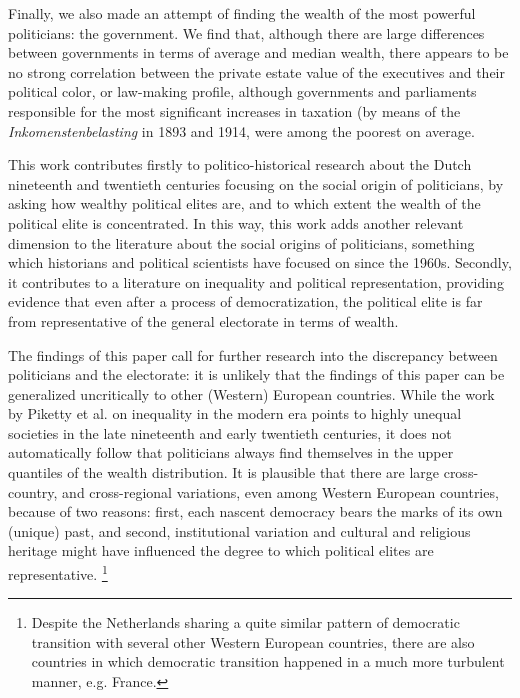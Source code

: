     Finally, we also made an attempt of finding the wealth of the most powerful politicians: the government. We find that, although there are large differences between governments in terms of average and median wealth, there appears to be no strong correlation between the private estate value of the executives and their political color, or law-making profile, although governments and parliaments responsible for the most significant increases in taxation (by means of the \textit{Inkomenstenbelasting} in 1893 and 1914, were among the poorest on average.

    This work contributes firstly to politico-historical research about the Dutch nineteenth and twentieth centuries focusing on the social origin of politicians, by asking how wealthy political elites are, and to which extent the wealth of the political elite is concentrated. \autocite{van1983toegang, secker1989social, secker1991ministers, van1999eerste, moes2012onder} In this way, this work adds another relevant dimension to the literature about the social origins of politicians, something which historians and political scientists have focused on since the 1960s.\autocite{dogan1967filieres,van1983toegang} Secondly, it contributes to a literature on inequality and political representation, providing evidence that even after a process of democratization, the political elite is far from representative of the general electorate in terms of wealth.\autocite{dalton1985political}

    The findings of this paper call for further research into the discrepancy between politicians and the electorate: it is unlikely that the findings of this paper can be generalized uncritically to other (Western) European countries. While the work by Piketty et al. on inequality in the modern era points to highly unequal societies in the late nineteenth and early twentieth centuries, it does not automatically follow that politicians always find themselves in the upper quantiles of the wealth distribution. \autocite{piketty2003income, piketty2014inequality} It is plausible that there are large cross-country, and cross-regional variations, even among Western European countries, because of two reasons: first, each nascent democracy bears the marks of its own (unique) past, and second, institutional variation and cultural and religious heritage might have influenced the degree to which political elites are representative. \autocite{acemoglu2011consequences} \footnote{Despite the Netherlands sharing a quite similar pattern of democratic transition with several other Western European countries, there are also countries in which democratic transition happened in a much more turbulent manner, e.g. France. }

